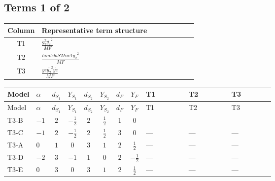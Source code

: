 \documentclass[8pt]{article}
\begin{document}
\begin{landscape}
\subsection*{Terms 1 of 2}
\begin{center}
\begin{tabular}{@{}c >{\raggedright\arraybackslash}p{0.82\linewidth}@{}}
\toprule
Column & Representative term structure \\
\midrule
T1 & \(\displaystyle \frac{g_{2}^{2} \overline{y_{2}}^{2}}{MF}\) \\
\midrule
T2 & \(\displaystyle \frac{lambdaS2Inv1 \overline{y_{2}}^{2}}{MF}\) \\
\midrule
T3 & \(\displaystyle \frac{ye \overline{y_{2}}^{2} \overline{ye}}{MF}\) \\
\midrule
\bottomrule
\end{tabular}
\end{center}
\smallskip
\tiny
\begin{longtable}{@{}llcccccc >{\raggedright\arraybackslash}p{0.21\linewidth} >{\raggedright\arraybackslash}p{0.21\linewidth} >{\raggedright\arraybackslash}p{0.21\linewidth}@{}}
\toprule
Model & $\alpha$ & $d_{S_1}$ & $Y_{S_1}$ & $d_{S_2}$ & $Y_{S_2}$ & $d_F$ & $Y_F$ & T1 & T2 & T3 \\
\midrule
\endfirsthead
\toprule
Model & $\alpha$ & $d_{S_1}$ & $Y_{S_1}$ & $d_{S_2}$ & $Y_{S_2}$ & $d_F$ & $Y_F$ & T1 & T2 & T3 \\
\midrule
\endhead
T3-B & $-1$ & $2$ & $-\frac{1}{2}$ & $2$ & $\frac{1}{2}$ & $1$ & $0$ & \scriptsize\adjustbox{max width=\linewidth}{$\begin{gathered} - \frac{3 g_{2}^{2} \overline{y_{2}}^{2}}{4 MF}\end{gathered}$} & \scriptsize\adjustbox{max width=\linewidth}{$\begin{gathered} - \frac{lambdaS2Inv1 \overline{y_{2}}^{2}}{2 MF}\end{gathered}$} & \scriptsize\adjustbox{max width=\linewidth}{$\begin{gathered} \frac{ye \overline{y_{2}}^{2} \overline{ye}}{4 MF}\end{gathered}$} \\
\midrule
T3-C & $-1$ & $2$ & $-\frac{1}{2}$ & $2$ & $\frac{1}{2}$ & $3$ & $0$ & --- & --- & --- \\
\midrule
T3-A & $0$ & $1$ & $0$ & $3$ & $1$ & $2$ & $\frac{1}{2}$ & --- & --- & --- \\
\midrule
T3-D & $-2$ & $3$ & $-1$ & $1$ & $0$ & $2$ & $-\frac{1}{2}$ & --- & --- & --- \\
\midrule
T3-E & $0$ & $3$ & $0$ & $3$ & $1$ & $2$ & $\frac{1}{2}$ & --- & --- & --- \\
\midrule
\bottomrule
\end{longtable}
\clearpage

\end{landscape}
\end{document}
